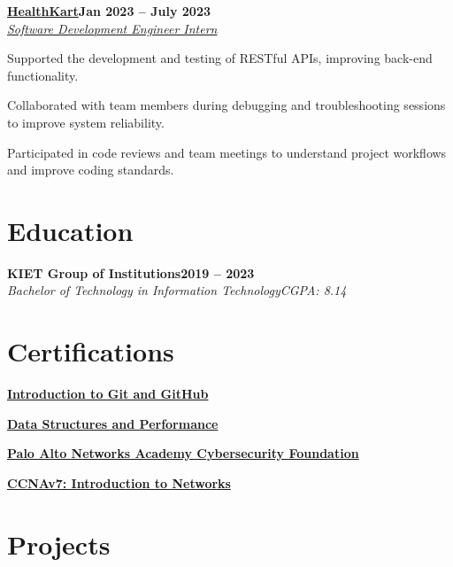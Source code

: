 \documentclass[letterpaper,10pt]{article}
\newcommand{\heading}[2]{
  \hspace{10pt}#1\hfill#2\\
}
\newcommand{\headingBf}[2]{
  \heading{\textbf{#1}}{\textbf{#2}}
}
\newcommand{\headingIt}[2]{
  \heading{\textit{#1}}{\textit{#2}}
}
\newenvironment{resume_list}{
  \vspace{-7pt}
  \begin{itemize}[itemsep=-2px, parsep=1pt, leftmargin=30pt]
}{
  \end{itemize}
}
\begin{document}
\headingBf{\href{https://www.healthcart.com}{HealthKart}}{Jan 2023 -- July 2023} 
\headingIt{\href {https://drive.google.com/file/d/1Iz83NKtrG7A1KG_rK0P8s_sAquzRm_OY/view?usp=sharing}{Software Development Engineer Intern}}{}
\begin{resume_list}
  \item Supported the development and testing of RESTful APIs, improving back-end functionality.
  \item Collaborated with team members during debugging and troubleshooting sessions to improve system reliability.  
  \item Participated in code reviews and team meetings to understand project workflows and improve coding standards.  
\end{resume_list}


\section{Education}

\headingBf{KIET Group of Institutions}{2019 -- 2023}
\headingIt{Bachelor of Technology in Information Technology}{CGPA: 8.14}

\section{Certifications}
\begin{resume_list}  

\item \headingBf{\href {https://www.coursera.org/account/accomplishments/verify/VAXY9EEWXD3C}{Introduction to Git and GitHub}}{}

\item \headingBf{\href {https://www.coursera.org/account/accomplishments/verify/MEHYBBVAYE8E}{Data Structures and Performance}}{}

\item \headingBf{\href {https://www.coursera.org/account/accomplishments/verify/R73VUS4L44RN}{Palo Alto Networks Academy Cybersecurity Foundation}}{}

\item \headingBf{\href {https://drive.google.com/file/d/15n4G1_3d75gbxfikhzodotRZVXInxqhJ/view?usp=sharing}{CCNAv7: Introduction to Networks}}{}
\end{resume_list}

\section{Projects}
\end{document}
